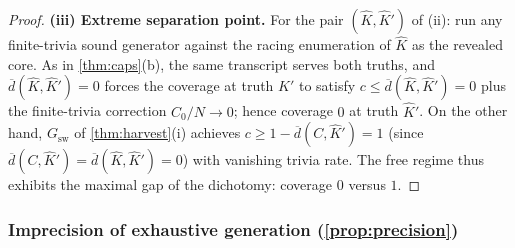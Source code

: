 \documentclass[11pt]{article}
\numberwithin{equation}{section}
\newcommand{\Core}{C}
\newcommand{\dup}[2]{\overline{d}(#1,#2)}
\newcommand{\cov}{c}
\theoremstyle{plain}
\theoremstyle{definition}
\theoremstyle{remark}
\begin{document}
\begin{proof}
\medskip\noindent\textbf{(iii) Extreme separation point.}\quad
For the pair $(\hat K, \hat K')$ of (ii): run any finite-trivia sound generator against the
racing enumeration of $\hat K$ as the revealed core. As in \cref{thm:caps}(b), the same
transcript serves both truths, and $\dup{\hat K}{\hat K'} = 0$ forces the coverage at truth
$\hat K'$ to satisfy $\cov \le \dup{\hat K}{\hat K'} = 0$ plus the finite-trivia correction
$C_0/N \to 0$; hence coverage $0$ at truth $\hat K'$. On the other hand, $G_{\mathrm{sw}}$ of
\cref{thm:harvest}(i) achieves $\cov \ge 1 - \dup{\Core}{\hat K'} = 1$ (since
$\dup{\Core}{\hat K'} = \dup{\hat K}{\hat K'} = 0$) with vanishing trivia rate. The free
regime thus exhibits the maximal gap of the dichotomy: coverage $0$ versus $1$.
\end{proof}

\subsubsection{Imprecision of exhaustive generation (\texorpdfstring{\cref{prop:precision}}{Proposition 9})}
\end{document}
